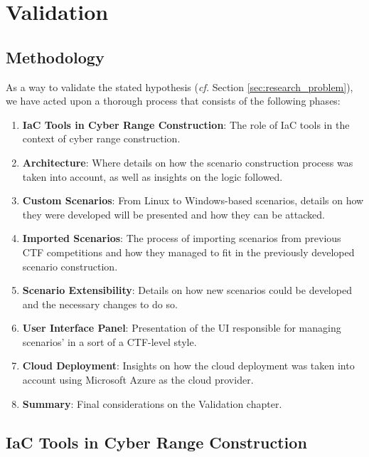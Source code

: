 \chapter{Validation}\label{chap:validation}

\minitoc

\section{Methodology} \label{sec:validation_methodology}

As a way to validate the stated hypothesis (\textit{cf.} Section \ref{sec:research_problem}), we have acted upon a thorough process that consists of the following phases:

\begin{enumerate}
    \item \textbf{IaC Tools in Cyber Range Construction}: The role of IaC tools in the context of cyber range construction. %
    \item \textbf{Architecture}: Where details on how the scenario construction process was taken into account, as well as insights on the logic followed.%
    \item \textbf{Custom Scenarios}: From Linux to Windows-based scenarios, details on how they were developed will be presented and how they can be attacked.
    \item \textbf{Imported Scenarios}: The process of importing scenarios from previous CTF competitions and how they managed to fit in the previously developed scenario construction.
    \item \textbf{Scenario Extensibility}: Details on how new scenarios could be developed and the necessary changes to do so.
    \item \textbf{User Interface Panel}: Presentation of the UI responsible for managing scenarios' in a sort of a CTF-level style.
    \item \textbf{Cloud Deployment}: Insights on how the cloud deployment was taken into account using Microsoft Azure as the cloud provider.
    \item \textbf{Summary}: Final considerations on the Validation chapter.
\end{enumerate}


\section{IaC Tools in Cyber Range Construction} \label{sec:validation_iac_tools_in_cr_construction}

